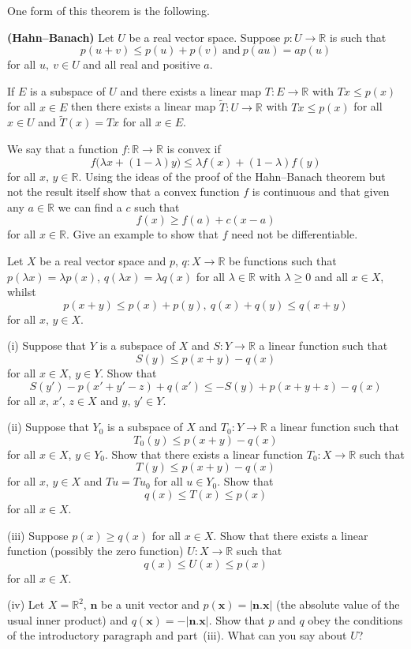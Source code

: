 One form of this theorem is the following.
\begin{theorem}{\bf (Hahn--Banach)}\label{T;Hahn--Banach} Let $U$
be a real vector space. Suppose
$p:U\rightarrow{\mathbb R}$ is such that
\[p(u+v)\leq p(u)+p(v)\ \text{and}\ p(au)=ap(u)\]
for all $u,\ v\in U$ and all real and positive $a$.

If $E$ is a subspace of $U$ and there exists
a linear map $T:E\rightarrow{\mathbb R}$
with $Tx\leq p(x)$ for all $x\in E$
then there exists 
a linear map $\tilde{T}:U\rightarrow{\mathbb R}$
with $Tx\leq p(x)$ for all $x\in U$
and $\tilde{T}(x)=Tx$ for all $x\in E$.
\end{theorem}
\begin{added}[Exercise] We say that a function
$f:{\mathbb R}\rightarrow{\mathbb R}$ is convex if
\[f\big(\lambda x+(1-\lambda)y\big)\leq \lambda f(x)+(1-\lambda)f(y)\]
for all $x,\,y\in{\mathbb R}$. Using the ideas of the
proof of the Hahn--Banach theorem but not the result itself
show that a convex function $f$ is continuous
and that given any $a\in{\mathbb R}$ we can find
a $c$ such that
\[f(x)\geq f(a)+c(x-a)\]
for all $x\in{\mathbb R}$. Give an example to show that
$f$ need not be differentiable.
\end{added}
\begin{added}[Exercise] Let $X$ be a real vector space and
$p,\,q:X\rightarrow {\mathbb R}$ be functions such that
$p(\lambda x)=\lambda p(x)$, $q(\lambda x)=\lambda q(x)$
for all $\lambda\in{\mathbb R}$ with $\lambda\geq 0$
and all $x\in X$, whilst
\[p(x+y)\leq p(x)+p(y),\ q(x)+q(y)\leq q(x+y)\]
for all $x,\,y\in X$.

(i) Suppose that $Y$ is a subspace of $X$ and 
$S:Y\rightarrow{\mathbb R}$ a linear function such that
\[S(y)\leq p(x+y)-q(x)\]
for all $x\in X$, $y\in Y$. Show that
\[S(y')-p(x'+y'-z)+q(x')\leq -S(y)+p(x+y+z)-q(x)\]
for all $x,\,x',\,z\in X$ and $y,\,y' \in Y$.

(ii) Suppose that $Y_{0}$ is a subspace of $X$ and
$T_{0}:Y\rightarrow{\mathbb R}$ a linear function such that
\[T_{0}(y)\leq p(x+y)-q(x)\]
for all $x\in X$, $y\in Y_{0}$. Show that there exists a linear
function $T_{0}:X\rightarrow{\mathbb R}$ such that
\[T(y)\leq p(x+y)-q(x)\]
for all $x,\,y\in X$ and $Tu=Tu_{0}$  for all $u\in Y_{0}$.
Show that 
\[q(x)\leq T(x)\leq p(x)\]
for all $x\in X$.

(iii) Suppose $p(x)\geq q(x)$ for all $x\in X$. 
Show that there exists 
a linear function (possibly the zero function) 
$U:X\rightarrow{\mathbb R}$
such that
\[q(x)\leq U(x)\leq p(x)\]
for all $x\in X$.

(iv) Let $X={\mathbb R}^{2}$, ${\mathbf n}$ be a unit vector
and $p({\mathbf x})=|{\mathbf n}.{\mathbf x}|$
(the absolute value of the usual inner product)
and $q({\mathbf x})=-|{\mathbf n}.{\mathbf x}|$.
Show that $p$ and $q$ obey the conditions of the introductory
paragraph and part~(iii). What can you say about $U$? 
\end{added}
